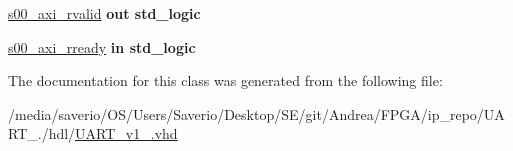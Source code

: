 \begin{DoxyCompactItemize}
\item 
\mbox{\label{classUART__v1__0_af180911f7eb262e530e26865bc97aa0b}} 
\hyperlink{classUART__v1__0_af180911f7eb262e530e26865bc97aa0b}{s00\+\_\+axi\+\_\+rvalid}  {\bfseries {\bfseries \textcolor{vhdlchar}{out}\textcolor{vhdlchar}{ }}} {\bfseries \textcolor{vhdlchar}{std\+\_\+logic}\textcolor{vhdlchar}{ }} 
\item 
\mbox{\label{classUART__v1__0_a8b82eb165d7024f6c7b25646f6ebdd4d}} 
\hyperlink{classUART__v1__0_a8b82eb165d7024f6c7b25646f6ebdd4d}{s00\+\_\+axi\+\_\+rready}  {\bfseries {\bfseries \textcolor{vhdlchar}{in}\textcolor{vhdlchar}{ }}} {\bfseries \textcolor{vhdlchar}{std\+\_\+logic}\textcolor{vhdlchar}{ }} 
\end{DoxyCompactItemize}


The documentation for this class was generated from the following file\+:\begin{DoxyCompactItemize}
\item 
/media/saverio/\+O\+S/\+Users/\+Saverio/\+Desktop/\+S\+E/git/\+Andrea/\+F\+P\+G\+A/ip\+\_\+repo/\+U\+A\+R\+T\+\_./hdl/\hyperlink{UART__v1__0_8vhd}{U\+A\+R\+T\+\_\+v1\+\_.\+vhd}\end{DoxyCompactItemize}
